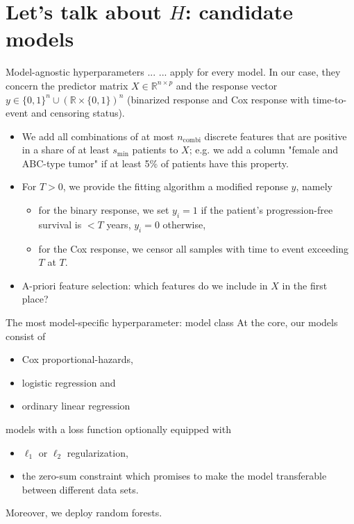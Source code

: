 \documentclass[10pt, aspectratio=169]{beamer}
\def\RR{\mathbb{R}}
\begin{document}
\section{Let's talk about $H$: candidate models}

\begin{frame}{Model-agnostic hyperparameters ...}
  ... apply for every model. In our case, they concern the predictor matrix 
  $X \in \RR^{n \times p}$ and the response vector $y \in \{ 0, 1 \}^n \cup 
  (\RR \times \{0, 1 \})^n$ (binarized response and Cox response with time-to-event 
  and censoring status).

  \begin{itemize}
    \item We add all combinations of at most $n_{\text{combi}}$ discrete features 
      that are positive in a share of at least $s_{\text{min}}$ patients to $X$; e.g. 
      we add a column "female and ABC-type tumor" if at least 5\% of patients 
      have this property.
    \item For $T > 0$, we provide the fitting algorithm a modified reponse $y$, namely
      \begin{itemize}
        \item for the binary response, we set $y_i = 1$ if the patient's progression-free 
          survival is $< T$ years, $y_i = 0$ otherwise,
        \item for the Cox response, we censor all samples with time to event 
          exceeding $T$ at $T$.
      \end{itemize}
    \item A-priori feature selection: which features do we include in $X$ in the 
      first place?
  \end{itemize}
\end{frame}

\begin{frame}{The most model-specific hyperparameter: model class}
  At the core, our models consist of 
  \begin{itemize}
    \item Cox proportional-hazards,
    \item logistic regression and 
    \item ordinary linear regression
  \end{itemize}
  models with a loss function optionally equipped with
  \begin{itemize}
    \item $\ell_1$ or $\ell_2$ regularization,
    \item the zero-sum constraint which promises to make the model transferable
      between different data sets.
  \end{itemize}

  Moreover, we deploy random forests.
\end{frame}
\end{document}
